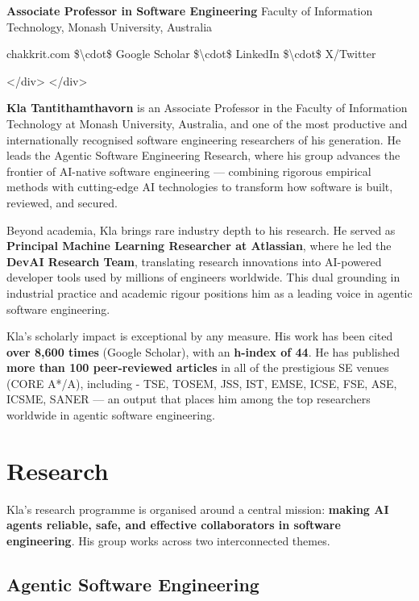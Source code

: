 \documentclass[11pt,a4paper]{book}
\begin{document}
\textbf{Associate Professor in Software Engineering}  
Faculty of Information Technology, Monash University, Australia

chakkrit.com \$\textbackslash{}cdot\$ Google Scholar \$\textbackslash{}cdot\$ LinkedIn \$\textbackslash{}cdot\$ X/Twitter

  </div>
</div>

\medskip

\textbf{Kla Tantithamthavorn} is an Associate Professor in the Faculty of Information Technology at Monash University, Australia, and one of the most productive and internationally recognised software engineering researchers of his generation. He leads the Agentic Software Engineering Research, where his group advances the frontier of AI-native software engineering --- combining rigorous empirical methods with cutting-edge AI technologies to transform how software is built, reviewed, and secured.

Beyond academia, Kla brings rare industry depth to his research. He served as \textbf{Principal Machine Learning Researcher at Atlassian}, where he led the \textbf{DevAI Research Team}, translating research innovations into AI-powered developer tools used by millions of engineers worldwide. This dual grounding in industrial practice and academic rigour positions him as a leading voice in agentic software engineering.

Kla's scholarly impact is exceptional by any measure. His work has been cited \textbf{over 8,600 times} (Google Scholar), with an \textbf{h-index of 44}. He has published \textbf{more than 100 peer-reviewed articles} in all of the prestigious SE venues (CORE A*/A), including - TSE, TOSEM, JSS, IST, EMSE, ICSE, FSE, ASE, ICSME, SANER --- an output that places him among the top researchers worldwide in agentic software engineering.

\medskip

\section{Research}

Kla's research programme is organised around a central mission: \textbf{making AI agents reliable, safe, and effective collaborators in software engineering}. His group works across two interconnected themes.

\subsection{Agentic Software Engineering}
\end{document}
